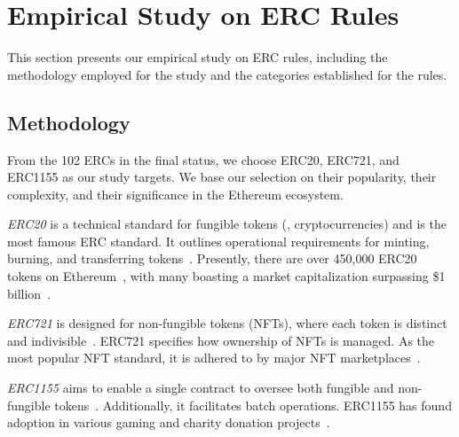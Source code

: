 \section{Empirical Study on ERC Rules}
\label{sec:study}

This section presents our empirical study on ERC rules, including the methodology employed for the study and the categories established for the rules. 


\subsection{Methodology}


From the 102 ERCs in the final status, 
we choose ERC20, ERC721, and ERC1155 
as our study targets. 
We base our selection on their popularity,  
their complexity, 
and their significance in the Ethereum ecosystem.

\emph{ERC20} is a technical standard for fungible tokens (\eg, cryptocurrencies) 
and is the most famous ERC standard.
It outlines operational requirements for minting, burning, and transferring 
tokens~\cite{erc20}. 
Presently, there are over 450,000 ERC20 tokens on Ethereum~\cite{erc20-popular}, 
with many boasting a market capitalization surpassing \$1 billion~\cite{USDT,SHIB,Binance}.


\emph{ERC721} is designed for non-fungible tokens (NFTs), where each token is 
distinct and indivisible~\cite{erc721}. ERC721 specifies how ownership of NFTs 
is managed. 
As the most popular NFT standard, 
it is adhered to by major NFT marketplaces~\cite{opensea,rarible}.

\emph{ERC1155} aims to enable a single contract to oversee both fungible and 
non-fungible tokens~\cite{erc1155}. Additionally, it facilitates batch 
operations. 
ERC1155 has found adoption in various gaming and 
charity donation projects~\cite{Horizon,9Lives,Reewardio}.


